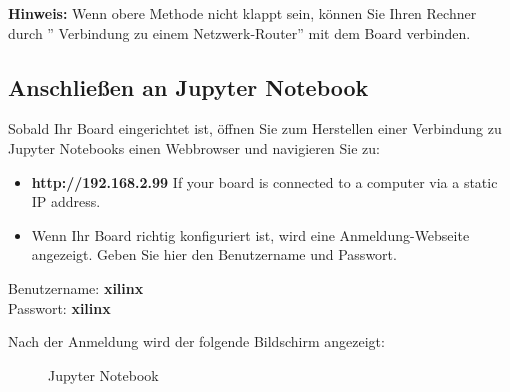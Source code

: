 \documentclass[a4paper]{report}
\begin{document}
\textbf{Hinweis: } Wenn obere Methode nicht klappt sein, können Sie Ihren Rechner durch '' Verbindung zu einem Netzwerk-Router'' mit dem Board verbinden. 


\subsection{Anschließen an Jupyter Notebook}

Sobald Ihr Board eingerichtet ist, öffnen Sie zum Herstellen einer Verbindung zu Jupyter Notebooks einen Webbrowser und navigieren Sie zu:\\
		
		\begin{itemize} 
		\item \textbf{http://192.168.2.99} If your board is connected to a computer via a static IP address.
		\item Wenn Ihr Board richtig konfiguriert ist, wird eine Anmeldung-Webseite angezeigt.
		Geben Sie hier den Benutzername und Passwort.
		\end{itemize}

		\begin{tcolorbox}
		Benutzername: \textbf{xilinx}\\
		Passwort: \textbf{xilinx}
		\end{tcolorbox}

Nach der Anmeldung wird der folgende Bildschirm angezeigt:

	\begin{figure}[H]
	\centering
	\caption{Jupyter Notebook}
	\label{fig:Jupyter_Notebook}
	\end{figure}
\end{document}
